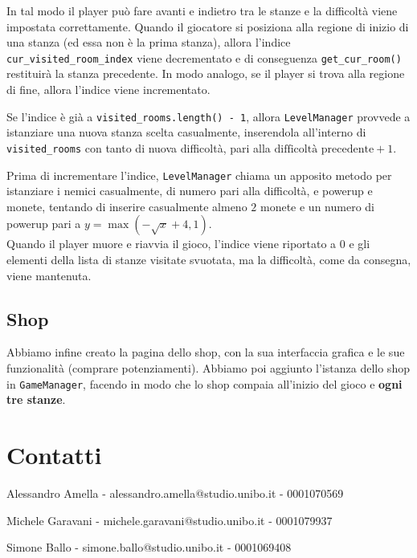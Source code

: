 \documentclass[a4paper,12pt]{article}
\begin{document}
In tal modo il player può fare avanti e indietro tra le stanze e la difficoltà viene impostata correttamente.
Quando il giocatore si posiziona alla regione di inizio di una stanza (ed essa non è la prima stanza), allora l'indice \texttt{cur\_visited\_room\_index} viene decrementato e di conseguenza \texttt{get\_cur\_room()} restituirà la stanza precedente.
In modo analogo, se il player si trova alla regione di fine, allora l'indice viene incrementato. 

Se l'indice è già a \texttt{visited\_rooms.length() - 1}, allora \texttt{LevelManager} provvede a istanziare una nuova stanza scelta casualmente, inserendola all'interno di \texttt{visited\_rooms} con tanto di nuova difficoltà, pari alla $\text{difficoltà precedente} + 1$.

Prima di incrementare l'indice, \texttt{LevelManager} chiama un apposito metodo per istanziare i nemici casualmente, di numero pari alla difficoltà, e powerup e monete, tentando di inserire casualmente almeno $2$ monete e un numero di powerup pari a $y = \max\left(-\sqrt{x} + 4, 1\right)$. \\

Quando il player muore e riavvia il gioco, l'indice viene riportato a 0 e gli elementi della lista di stanze visitate svuotata, ma la difficoltà, come da consegna, viene mantenuta.

\subsection{Shop}

Abbiamo infine creato la pagina dello shop, con la sua interfaccia grafica e le sue funzionalità (comprare potenziamenti). Abbiamo poi aggiunto l'istanza dello shop in \texttt{GameManager}, facendo in modo che lo shop compaia all'inizio del gioco e \textbf{ogni tre stanze}.

\appendix
\section{Contatti}

\centering

Alessandro Amella - alessandro.amella@studio.unibo.it - 0001070569

Michele Garavani - michele.garavani@studio.unibo.it - 0001079937

Simone Ballo - simone.ballo@studio.unibo.it - 0001069408
\end{document}
